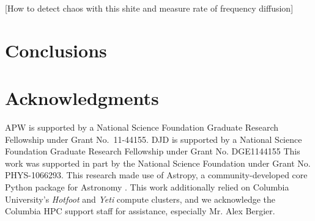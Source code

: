 \documentclass[usenatbib]{mn2e}
\begin{document}
[How to detect chaos with this shite and measure rate of frequency diffusion]

\section{Conclusions}\label{sec:conclusions}

\section{Acknowledgments}
APW is supported by a National Science Foundation Graduate Research Fellowship under Grant No.\ 11-44155. DJD is supported by a National Science Foundation Graduate Research Fellowship under Grant No. DGE1144155
This work was supported in part by the National Science Foundation under Grant No. PHYS-1066293.
This research made use of Astropy, a community-developed core Python package for Astronomy \citep{astropy13}.
This work additionally relied on Columbia University's \emph{Hotfoot} and \emph{Yeti} compute clusters, and we acknowledge the Columbia HPC support staff for assistance, especially Mr. Alex Bergier. 

%
%
\end{document}

